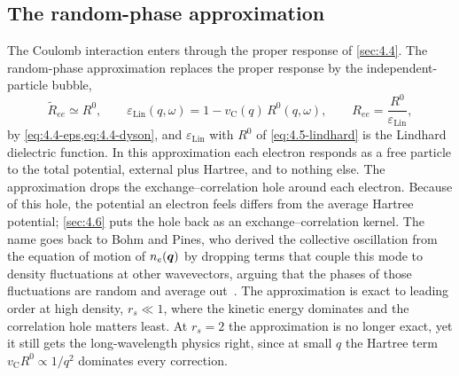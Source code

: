 \subsection{The random-phase approximation}

The Coulomb interaction enters through the proper response of \cref{sec:4.4}. The random-phase approximation replaces the proper response by the independent-particle bubble,
\begin{equation}
  \tilde R_{ee} \simeq R^0, \qquad
  \varepsilon_{\mathrm{Lin}}(q,\omega) = 1 - v_{\mathrm{C}}(q)\,R^0(q,\omega), \qquad
  R_{ee} = \frac{R^0}{\varepsilon_{\mathrm{Lin}}} ,
  \label{eq:4.5-rpa}
\end{equation}
by \cref{eq:4.4-eps,eq:4.4-dyson}, and $\varepsilon_{\mathrm{Lin}}$ with $R^0$ of \cref{eq:4.5-lindhard} is the Lindhard dielectric function. In this approximation each electron responds as a free particle to the total potential, external plus Hartree, and to nothing else. The approximation drops the exchange--correlation hole around each electron. Because of this hole, the potential an electron feels differs from the average Hartree potential; \cref{sec:4.6} puts the hole back as an exchange--correlation kernel. The name goes back to Bohm and Pines, who derived the collective oscillation from the equation of motion of $n_e(\bm{q})$ by dropping terms that couple this mode to density fluctuations at other wavevectors, arguing that the phases of those fluctuations are random and average out~\cite{bohm1953collective}. The approximation is exact to leading order at high density, $r_s \ll 1$, where the kinetic energy dominates and the correlation hole matters least. At $r_s = 2$ the approximation is no longer exact, yet it still gets the long-wavelength physics right, since at small $q$ the Hartree term $v_{\mathrm{C}}R^0 \propto 1/q^2$ dominates every correction.

